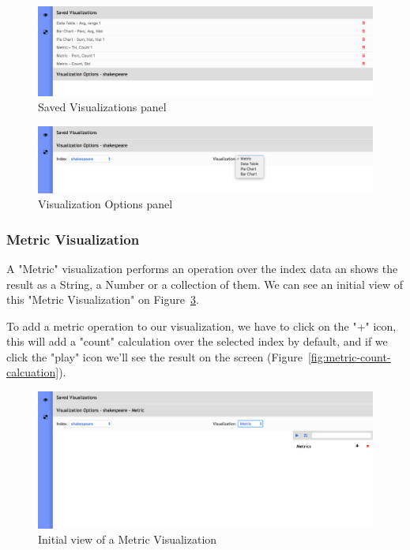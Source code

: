 \documentclass[a4paper, 12pt, english]{book}
\begin{document}
\begin{figure}
  \centering
  \includegraphics[width=13cm, keepaspectratio]{img/saved-visualizations.png}
  \caption{Saved Visualizations panel}
  \label{fig:saved-visualizations}
\end{figure}

\begin{figure}
  \centering
  \includegraphics[width=13cm, keepaspectratio]{img/visualization-options.png}
  \caption{Visualization Options panel}
  \label{fig:visualization-options}
\end{figure}

\subsubsection{Metric Visualization}
\label{sec:metric-visualization}
A "Metric" visualization performs an operation over the index data an shows the result as a String, a Number or a collection of them. We can see an initial view of this "Metric Visualization" on Figure~\ref{fig:metric-visualization-initial-view}.

To add a metric operation to our visualization, we have to click on the "+" icon, this will add a "count" calculation over the selected index by default, and if we click the "play" icon we'll see the result on the screen (Figure~\ref{fig:metric-count-calcuation}).

\begin{figure}
  \centering
  \includegraphics[width=13cm, keepaspectratio]{img/metric-visualization-initial-view.png}
  \caption{Initial view of a Metric Visualization}
  \label{fig:metric-visualization-initial-view}
\end{figure}
\end{document}

